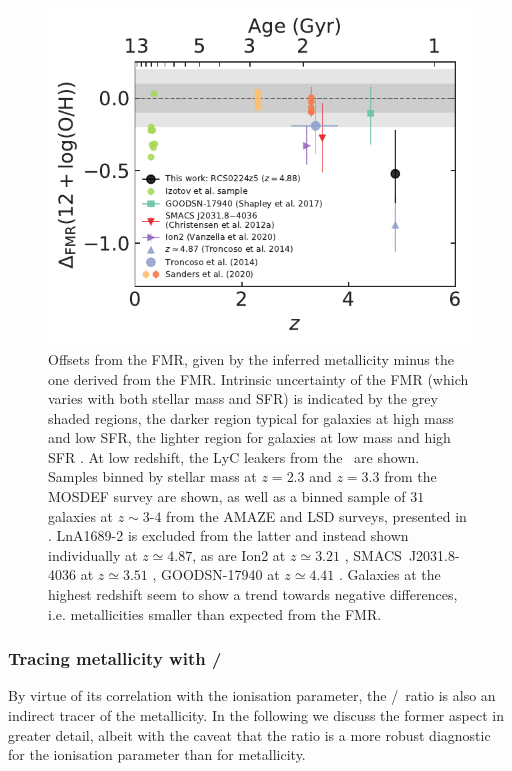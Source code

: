 \begin{figure}
    \centering
    \includegraphics[width=0.6\linewidth]{"Plots/ChapterA/Delta_FMR"}
    \caption[Offsets from the FMR]{Offsets from the FMR, given by the inferred metallicity minus the one derived from the FMR. Intrinsic uncertainty of the FMR (which varies with both stellar mass and SFR) is indicated by the grey shaded regions, the darker region typical for galaxies at high mass and low SFR, the lighter region for galaxies at low mass and high SFR \citep[for details, see][]{2020MNRAS.491..944C}. At low redshift, the LyC leakers from the \Isample\ are shown. Samples binned by stellar mass at $z = 2.3$ and $z = 3.3$ from the MOSDEF survey \citep{2021ApJ...914...19S} are shown, as well as a binned sample of $31$ galaxies at $z \sim 3$-$4$ from the AMAZE and LSD surveys, presented in \citet{2014A&A...563A..58T}. LnA1689-2 is excluded from the latter and instead shown individually at $z \simeq 4.87$, as are Ion2 at $z \simeq 3.21$ \citep{2020MNRAS.491.1093V}, SMACS~J2031.8-4036 at $z \simeq 3.51$ \citep{2012MNRAS.427.1953C}, GOODSN-17940 at $z \simeq 4.41$ \citep{2017ApJ...846L..30S}. Galaxies at the highest redshift seem to show a trend towards negative differences, i.e. metallicities smaller than expected from the FMR.}
    \label{chAfig:NeIII/OII delta FMR}
\end{figure}

\subsubsection{Tracing metallicity with \texorpdfstring{\NeIII/\OII}{[Ne III]/[O II]}}
\label{chAsssec:Tracing metallicity with NeIII/OII}

By virtue of its correlation with the ionisation parameter, the \NeIII/\OII\ ratio is also an indirect tracer of the metallicity. In the following we discuss the former aspect in greater detail, albeit with the caveat that the ratio is a more robust diagnostic for the ionisation parameter than for metallicity.

